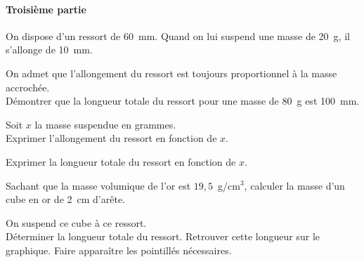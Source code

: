 \paragraph{Troisième partie}\hfill\newline
On dispose d'un ressort de $60$~mm. Quand on lui suspend une masse de 20~g, il s'allonge de 10~mm.
\begin{myenumerate}
\item On admet que l'allongement du ressort est toujours proportionnel à la masse accrochée.\\
Démontrer que la longueur totale du ressort pour une masse de 80~g est 100~mm.
\item Soit $x$ la masse suspendue en grammes.\\
Exprimer l'allongement du ressort en fonction de $x$.
\item Exprimer la longueur totale du ressort en fonction de $x$.
\item Sachant que la masse volumique de l'or est $19,5$~g/cm$^3$, calculer la masse d'un cube en or de 2~cm d'arête.
\item On suspend ce cube à ce ressort.\\
Déterminer la longueur totale du ressort.
Retrouver cette longueur sur le graphique. Faire apparaître les pointillés nécessaires.
\end{myenumerate}